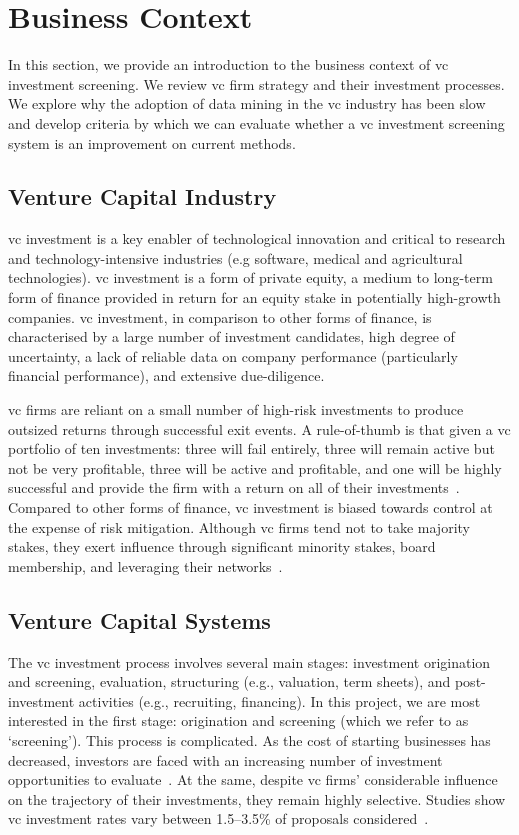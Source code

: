 \documentclass[../thesis/thesis.tex]{subfiles}
\begin{document}
\section{Business Context}

In this section, we provide an introduction to the business context of \gls{vc} investment screening. We review \gls{vc} firm strategy and their investment processes. We explore why the adoption of data mining in the \gls{vc} industry has been slow and develop criteria by which we can evaluate whether a \gls{vc} investment screening system is an improvement on current methods.

\subsection{Venture Capital Industry}

\Gls{vc} investment is a key enabler of technological innovation and critical to research and technology-intensive industries (e.g software, medical and agricultural technologies). \Gls{vc} investment is a form of private equity, a medium to long-term form of finance provided in return for an equity stake in potentially high-growth companies. \gls{vc} investment, in comparison to other forms of finance, is characterised by a large number of investment candidates, high degree of uncertainty, a lack of reliable data on company performance (particularly financial performance), and extensive due-diligence.

\Gls{vc} firms are reliant on a small number of high-risk investments to produce outsized returns through successful exit events. A rule-of-thumb is that given a \gls{vc} portfolio of ten investments: three will fail entirely, three will remain active but not be very profitable, three will be active and profitable, and one will be highly successful and provide the firm with a return on all of their investments~\cite{stone2014}. Compared to other forms of finance, \gls{vc} investment is biased towards control at the expense of risk mitigation. Although \gls{vc} firms tend not to take majority stakes, they exert influence through significant minority stakes, board membership, and leveraging their networks~\cite{fried2006}.

\subsection{Venture Capital Systems}

The \gls{vc} investment process involves several main stages: investment origination and screening, evaluation, structuring (e.g., valuation, term sheets), and post-investment activities (e.g., recruiting, financing). In this project, we are most interested in the first stage: origination and screening (which we refer to as `screening'). This process is complicated. As the cost of starting businesses has decreased, investors are faced with an increasing number of investment opportunities to evaluate~\cite{graham2013}. At the same, despite \gls{vc} firms' considerable influence on the trajectory of their investments, they remain highly selective. Studies show \gls{vc} investment rates vary between 1.5--3.5\% of proposals considered~\cite{stone2014}.
\end{document}
